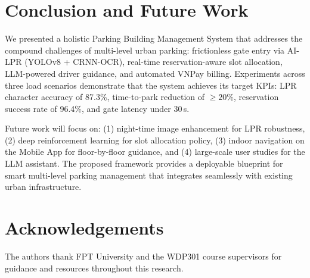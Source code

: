 \documentclass[runningheads]{llncs}
\begin{document}
\section{Conclusion and Future Work}
\label{sec:conclusion}

We presented a holistic Parking Building Management System
that addresses the compound challenges of multi-level urban
parking: frictionless gate entry via AI-LPR
(YOLOv8 + CRNN-OCR), real-time reservation-aware slot
allocation, LLM-powered driver guidance, and automated
VNPay billing. Experiments across three load scenarios
demonstrate that the system achieves its target KPIs: LPR
character accuracy of 87.3\%, time-to-park reduction of
$\geq 20\%$, reservation success rate of 96.4\%, and
gate latency under 30\,s.

Future work will focus on: (1) night-time image enhancement
for LPR robustness, (2) deep reinforcement learning for
slot allocation policy, (3) indoor navigation on the Mobile
App for floor-by-floor guidance, and (4) large-scale user
studies for the LLM assistant. The proposed framework
provides a deployable blueprint for smart multi-level parking
management that integrates seamlessly with existing urban
infrastructure.

\section*{Acknowledgements}
The authors thank FPT University and the WDP301 course
supervisors for guidance and resources throughout this
research.
\end{document}
